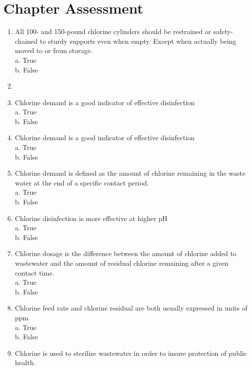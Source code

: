 \section*{Chapter Assessment}
\begin{tcolorbox}[breakable, enhanced,
colframe=blue!25,
colback=blue!10,
coltitle=blue!20!black,  
title= Chapter Assessment]
\begin{enumerate}
\item All 100- and 150-pound chlorine cylinders should be restrained or safety-chained to sturdy supports even when empty. Except when actually being moved to or from storage. \\
a. True \\
b. False \\
\item \item Chlorine demand is a good indicator of effective disinfection \\
a. True \\
b. False \\
\item Chlorine demand is a good indicator of effective disinfection \\
a. True \\
b. False \\
\item Chlorine demand is defined as the amount of chlorine remaining in the waste water at the end of a specific contact period. \\
a. True \\
b. False \\
\item Chlorine disinfection is more effective at higher pH \\
a. True \\
b. False \\
\item Chlorine dosage is the difference between the amount of chlorine added to wastewater and the amount of residual chlorine remaining after a given contact time. \\
a. True \\
b. False \\
\item Chlorine feed rate and chlorine residual are both usually expressed in units of ppm. \\
a. True \\
b. False \\
\item Chlorine is used to sterilize wastewater in order to insure protection of public health. \\

\end{enumerate}
\end{tcolorbox}

